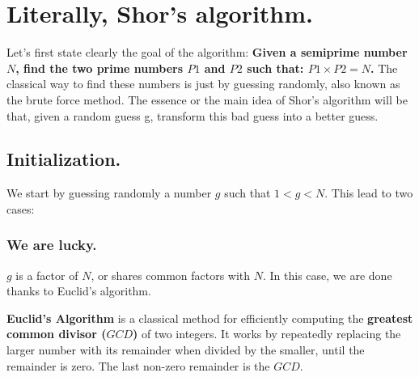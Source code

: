 \section{Literally, Shor’s algorithm.}
Let’s first state clearly the goal of the algorithm:
 \textbf{Given a semiprime number$ N$, find the two prime numbers $P1$ and $P2$ such that: $P1 \times P2 = N$.}\nl
The classical way to find these numbers is just by guessing randomly, also known as the brute force method. The essence or the main idea of Shor’s algorithm will be that, given a random guess g, transform this bad guess into a better guess.

\subsection{Initialization.}
We start by guessing randomly a number $g$ such that $1 < g < N$. This lead to two cases:
\subsubsection{We are lucky.}
$g$ is a factor of $N$, or shares common factors with $N$. In this case, we are done thanks to Euclid’s algorithm.
\begin{definitionbox}
    \textbf{Euclid’s Algorithm} is a classical method for efficiently computing the \textbf{greatest common divisor ($GCD$)} of two integers. It works by repeatedly replacing the larger number with its remainder when divided by the smaller, until the remainder is zero. The last non-zero remainder is the $GCD$. 
\end{definitionbox}

 



